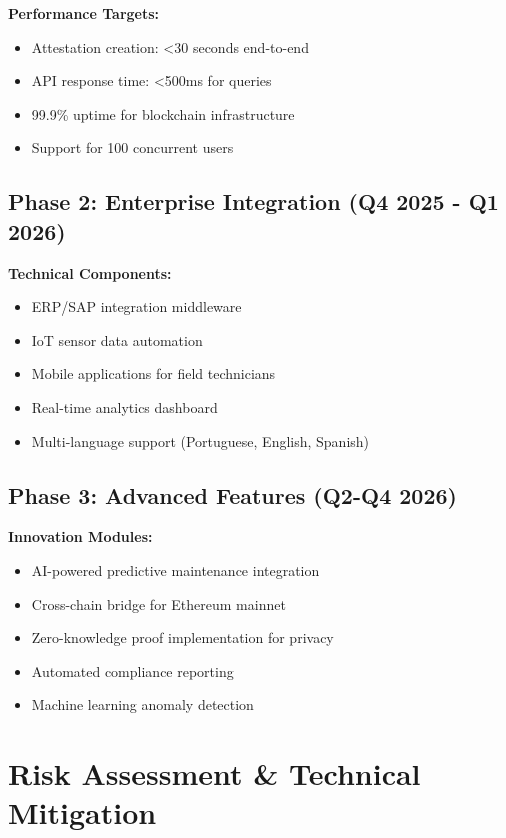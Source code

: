 \documentclass[11pt,a4paper]{article}
\begin{document}
\textbf{Performance Targets:}
\begin{itemize}[leftmargin=0.5cm]
    \item Attestation creation: <30 seconds end-to-end
    \item API response time: <500ms for queries
    \item 99.9\% uptime for blockchain infrastructure
    \item Support for 100 concurrent users
\end{itemize}

\subsection{Phase 2: Enterprise Integration (Q4 2025 - Q1 2026)}

\textbf{Technical Components:}
\begin{itemize}[leftmargin=0.5cm]
    \item ERP/SAP integration middleware
    \item IoT sensor data automation
    \item Mobile applications for field technicians
    \item Real-time analytics dashboard
    \item Multi-language support (Portuguese, English, Spanish)
\end{itemize}

\subsection{Phase 3: Advanced Features (Q2-Q4 2026)}

\textbf{Innovation Modules:}
\begin{itemize}[leftmargin=0.5cm]
    \item AI-powered predictive maintenance integration
    \item Cross-chain bridge for Ethereum mainnet
    \item Zero-knowledge proof implementation for privacy
    \item Automated compliance reporting
    \item Machine learning anomaly detection
\end{itemize}

\section{Risk Assessment \& Technical Mitigation}
\end{document}
